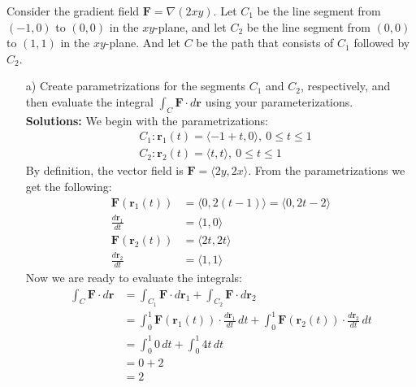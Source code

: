 \ifnum {}
    \question[4] Consider the gradient field $\mathbf{F}= \nabla(2xy)$. Let $C_1$ be the line segment from $(-1,0)$ to $(0,0)$ in the $xy$-plane, and let $C_2$ be the line segment from $(0,0)$ to $(1,1)$ in the $xy$-plane. And let $C$ be the path that consists of $C_1$ followed by $C_2$. 
    \begin{enumerate}
        \item[a)] Create parametrizations for the segments $C_1$ and $C_2$, respectively, and then evaluate the integral $\int_C \mathbf{F}\cdot d\mathbf{r}$ using your parameterizations.
            \ifnum {} {\color{DarkBlue} \\[12pt] 
            \textbf{Solutions:} 
            We begin with the parametrizations:
            \begin{align}
                &C_1: \mathbf r_1(t) = \langle -1+t, 0 \rangle, \  0\leqslant t \leqslant 1 \\
                &C_2: \mathbf r_2(t) = \langle t,t \rangle, \ 0\leqslant t \leqslant 1
            \end{align}
            By definition, the vector field is $\mathbf{F} = \langle 2y, 2x \rangle$.
            From the parametrizations we get the following:
            \begin{align}
                \mathbf{F}(\mathbf r_1 (t)) &= \langle 0, 2(t-1) \rangle  = \langle 0, 2t-2 \rangle  \\
                \frac{d\mathbf r_1}{dt} &= \langle 1, 0\rangle \\
                \mathbf{F}(\mathbf r_2(t)) &= \langle 2t,2t \rangle \\
                \frac{d\mathbf r_2}{dt} &= \langle 1,1 \rangle
            \end{align}
            Now we are ready to evaluate the integrals:
            \begin{align}
                \int_C \mathbf{F}\cdot d\mathbf{r} 
                &= \int_{C_1} \mathbf{F}\cdot d\mathbf r_1 + \int_{C_2} \mathbf{F}\cdot d\mathbf r_2 \\
                &= \int_{0}^1 \mathbf{F}(\mathbf r_1(t))\cdot \frac{d\mathbf r_1}{dt} \, dt + \int_{0}^1 \mathbf{F}(\mathbf r_2(t))\cdot \frac{d\mathbf r_2}{dt} \, dt \\
                &= \int_0^1 0 \, dt + \int_0^1 4t \, dt\\
                &= 0 + 2\\
                &= 2
            \end{align}
}
\end{enumerate}
